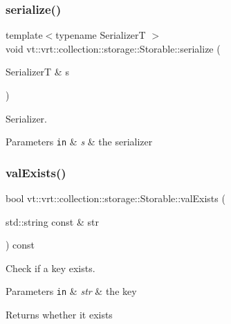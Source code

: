 \subsubsection{\texorpdfstring{serialize()}{serialize()}}
{\footnotesize\ttfamily template$<$typename SerializerT $>$ \\
void vt\+::vrt\+::collection\+::storage\+::\+Storable\+::serialize (\begin{DoxyParamCaption}\item[{SerializerT \&}]{s }\end{DoxyParamCaption})}



Serializer. 


\begin{DoxyParams}[1]{Parameters}
\mbox{\tt in}  & {\em s} & the serializer \\
\hline
\end{DoxyParams}
\mbox{\label{structvt_1_1vrt_1_1collection_1_1storage_1_1_storable_a46884264a54e5be7fc231208dc468b8e}} 
\subsubsection{\texorpdfstring{val\+Exists()}{valExists()}}
{\footnotesize\ttfamily bool vt\+::vrt\+::collection\+::storage\+::\+Storable\+::val\+Exists (\begin{DoxyParamCaption}\item[{std\+::string const \&}]{str }\end{DoxyParamCaption}) const}



Check if a key exists. 


\begin{DoxyParams}[1]{Parameters}
\mbox{\tt in}  & {\em str} & the key\\
\hline
\end{DoxyParams}
\begin{DoxyReturn}{Returns}
whether it exists 
\end{DoxyReturn}
\mbox{\label{structvt_1_1vrt_1_1collection_1_1storage_1_1_storable_a81a60463dff73c6375422344c8eb410c}} 
